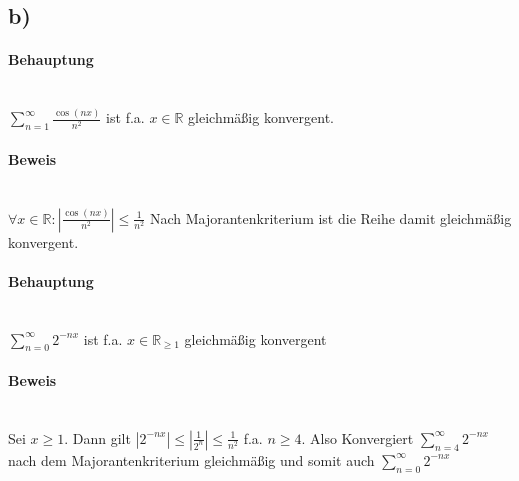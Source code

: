 \subsection*{b)}

\paragraph*{Behauptung} ~\\
$ \sum\limits_{n=1}^\infty \frac{\cos(nx)}{n^{2}} $ ist f.a. $x \in \mathbb{R}$ gleichmäßig konvergent.

\paragraph*{Beweis} ~\\
$ \forall x \in \mathbb{R} : |\frac{\cos(nx)}{n^{2}}| \leq \frac{1}{n^{2}} $
Nach Majorantenkriterium ist die Reihe damit gleichmäßig konvergent.

\paragraph*{Behauptung} ~\\
$ \sum\limits_{n=0}^\infty 2^{-nx}$ ist f.a. $x \in \mathbb{R}_{\geq 1}$ gleichmäßig konvergent

\paragraph{Beweis} ~\\
Sei $x \geq 1$. Dann gilt $|2^{-nx}| \leq |\frac{1}{2^{n}}| \leq \frac{1}{n^{2}}$ f.a. $n \geq 4$. Also Konvergiert $\sum\limits_{n=4}^\infty 2^{-nx}$ nach dem Majorantenkriterium gleichmäßig und somit auch $\sum\limits_{n=0}^\infty 2^{-nx}$
